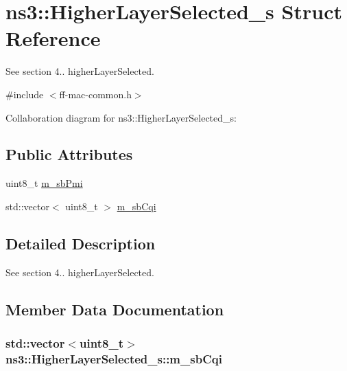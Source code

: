 \hypertarget{structns3_1_1HigherLayerSelected__s}{}\section{ns3\+:\+:Higher\+Layer\+Selected\+\_\+s Struct Reference}
\label{structns3_1_1HigherLayerSelected__s}


See section 4.. higher\+Layer\+Selected.  




{\ttfamily \#include $<$ff-\/mac-\/common.\+h$>$}



Collaboration diagram for ns3\+:\+:Higher\+Layer\+Selected\+\_\+s\+:
\subsection*{Public Attributes}
\begin{DoxyCompactItemize}
\item 
uint8\+\_\+t \hyperlink{structns3_1_1HigherLayerSelected__s_a4aa4dc94c19c124204ff6529071d0e88}{m\+\_\+sb\+Pmi}
\item 
std\+::vector$<$ uint8\+\_\+t $>$ \hyperlink{structns3_1_1HigherLayerSelected__s_a268c438a0238b52c04ac8fa77165c67f}{m\+\_\+sb\+Cqi}
\end{DoxyCompactItemize}


\subsection{Detailed Description}
See section 4.. higher\+Layer\+Selected. 

\subsection{Member Data Documentation}
\subsubsection[{\texorpdfstring{m\+\_\+sb\+Cqi}{m_sbCqi}}]{\setlength{\rightskip}{0pt plus 5cm}std\+::vector$<$uint8\+\_\+t$>$ ns3\+::\+Higher\+Layer\+Selected\+\_\+s\+::m\+\_\+sb\+Cqi}\hypertarget{structns3_1_1HigherLayerSelected__s_a268c438a0238b52c04ac8fa77165c67f}{}\label{structns3_1_1HigherLayerSelected__s_a268c438a0238b52c04ac8fa77165c67f}
